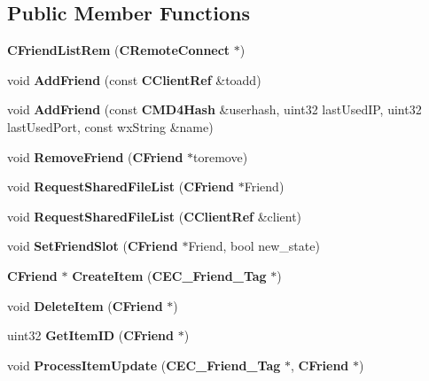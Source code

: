 \subsection*{Public Member Functions}
\begin{DoxyCompactItemize}
\item 
{\bfseries CFriendListRem} ({\bf CRemoteConnect} $\ast$)\label{classCFriendListRem_a9a1b9ae3640672d0f2e94679c3b02423}

\item 
void {\bfseries AddFriend} (const {\bf CClientRef} \&toadd)\label{classCFriendListRem_a7dd3912744512e1e6d4f4cdf11545f4c}

\item 
void {\bfseries AddFriend} (const {\bf CMD4Hash} \&userhash, uint32 lastUsedIP, uint32 lastUsedPort, const wxString \&name)\label{classCFriendListRem_acfd7acddceefb5573f610b1b58f80314}

\item 
void {\bfseries RemoveFriend} ({\bf CFriend} $\ast$toremove)\label{classCFriendListRem_a1e1e836953a6b6e042be5a6892746733}

\item 
void {\bfseries RequestSharedFileList} ({\bf CFriend} $\ast$Friend)\label{classCFriendListRem_a24dea8547d5254a61fad06cb2b208916}

\item 
void {\bfseries RequestSharedFileList} ({\bf CClientRef} \&client)\label{classCFriendListRem_a495a03eeb72bd4f028b07597398b455d}

\item 
void {\bfseries SetFriendSlot} ({\bf CFriend} $\ast$Friend, bool new\_\-state)\label{classCFriendListRem_a918413d46b0b977b37f882854d3a3a26}

\item 
{\bf CFriend} $\ast$ {\bfseries CreateItem} ({\bf CEC\_\-Friend\_\-Tag} $\ast$)\label{classCFriendListRem_ac1b2a6ff27e760657ddc4495121b624b}

\item 
void {\bfseries DeleteItem} ({\bf CFriend} $\ast$)\label{classCFriendListRem_a56a8d2fca6341dbb56d2ab7b12aff154}

\item 
uint32 {\bfseries GetItemID} ({\bf CFriend} $\ast$)\label{classCFriendListRem_a35775afdcfa97a203458559ce2d70995}

\item 
void {\bfseries ProcessItemUpdate} ({\bf CEC\_\-Friend\_\-Tag} $\ast$, {\bf CFriend} $\ast$)\label{classCFriendListRem_a1214f9533abcbb6fbffc44c67f40af53}

\end{DoxyCompactItemize}
